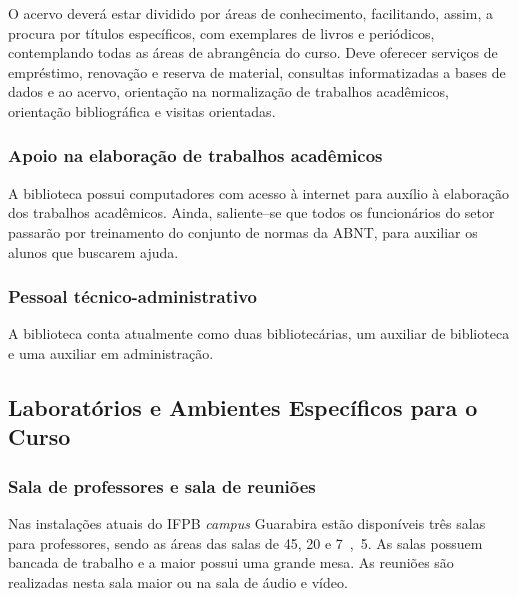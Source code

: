 O acervo deverá estar dividido por áreas de conhecimento, facilitando, assim, a procura por títulos específicos, com exemplares de livros e periódicos, contemplando todas as áreas de abrangência do curso. Deve oferecer serviços de empréstimo, renovação e reserva de material, consultas informatizadas a bases de dados e ao acervo, orientação na normalização de trabalhos acadêmicos, orientação bibliográfica e visitas orientadas.

\subsubsection{Apoio na elaboração de trabalhos acadêmicos}

A biblioteca possui computadores com acesso à internet para auxílio à elaboração dos trabalhos acadêmicos. Ainda, saliente–se que todos os funcionários do setor passarão por treinamento do conjunto de normas da ABNT, para auxiliar os alunos que buscarem ajuda.

\subsubsection{Pessoal técnico-administrativo}

A biblioteca conta atualmente como duas bibliotecárias, um auxiliar de biblioteca e uma auxiliar em administração.

\subsection{Laboratórios e Ambientes Específicos para o Curso}

\subsubsection{Sala de professores e sala de reuni\~oes}

Nas instalações atuais do IFPB \textit{campus} Guarabira estão disponíveis três salas para professores, sendo as áreas das salas de \unit{45}{\squaremetre}, \unit{20}{\squaremetre} e \unit{7,5}{\squaremetre}. As salas possuem bancada de trabalho e a maior possui uma grande mesa. As reuniões são realizadas nesta sala maior ou na sala de áudio e vídeo.



